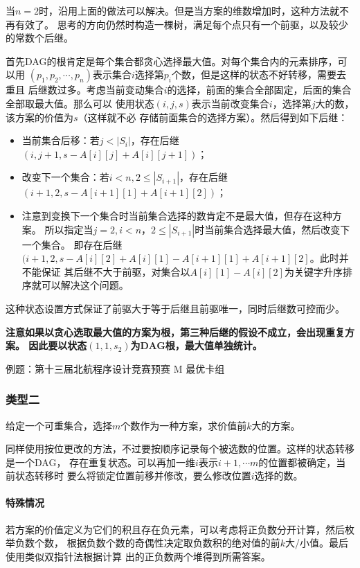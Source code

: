 当$n=2$时，沿用上面的做法可以解决。但是当方案的维数增加时，这种方法就不再有效了。
思考的方向仍然时构造一棵树，满足每个点只有一个前驱，以及较少的常数个后继。

首先DAG的根肯定是每个集合都贪心选择最大值。对每个集合内的元素排序，可以用
$(p_1,p_2,\cdots,p_n)$表示集合$i$选择第$p_i$个数，但是这样的状态不好转移，需要去重且
后继数过多。考虑当前变动集合$i$的选择，前面的集合全部固定，后面的集合全部取最大值。那么可以
使用状态$(i,j,s)$表示当前改变集合$i$，选择第$j$大的数，该方案的价值为$s$（这样就不必
存储前面集合的选择方案）。然后得到如下后继：
\begin{itemize}
	\item 当前集合后移：若$j<|S_i|$，存在后继$(i,j+1,s-A[i][j]+A[i][j+1])$；
	\item 改变下一个集合：若$i<n,2\leq |S_{i+1}|$，存在后继
	$(i+1,2,s-A[i+1][1]+A[i+1][2])$；
	\item 注意到变换下一个集合时当前集合选择的数肯定不是最大值，但存在这种方案。
	所以指定当$j=2,i<n，2\leq |S_{i+1}|$时当前集合选择最大值，然后改变下一个集合。
	即存在后继$(i+1,2,s-A[i][2]+A[i][1]-A[i+1][1]+A[i+1][2]$。此时并不能保证
	其后继不大于前驱，对集合以$A[i][1]-A[i][2]$为关键字升序排序就可以解决这个问题。
\end{itemize}

这种状态设置方式保证了前驱大于等于后继且前驱唯一，同时后继数可控而少。

{\bfseries 注意如果以贪心选取最大值的方案为根，第三种后继的假设不成立，会出现重复方案。
因此要以状态$(1,1,s_2)$为DAG根，最大值单独统计。}

例题：第十三届北航程序设计竞赛预赛 M 最优卡组


\subsubsection{类型二}
给定一个可重集合，选择$m$个数作为一种方案，求价值前$k$大的方案。

同样使用按位更改的方法，不过要按顺序记录每个被选数的位置。这样的状态转移是一个DAG，
存在重复状态。可以再加一维$i$表示$i+1,\cdots m$的位置都被确定，当前状态转移时
要么将锁定位置前移并修改，要么修改位置$i$选择的数。

\paragraph{特殊情况}
若方案的价值定义为它们的积且存在负元素，可以考虑将正负数分开计算，然后枚举负数个数，
根据负数个数的奇偶性决定取负数积的绝对值的前$k$大/小值。最后使用类似双指针法根据计算
出的正负数两个堆得到所需答案。

